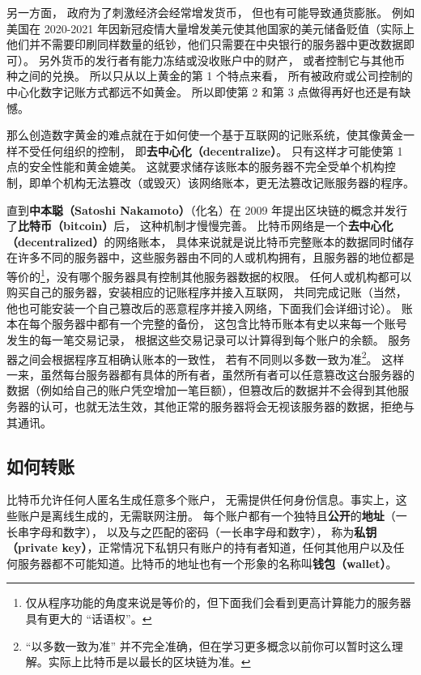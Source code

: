 另一方面， 政府为了刺激经济会经常增发货币， 但也有可能导致通货膨胀。 例如美国在 2020-2021 年因新冠疫情大量增发美元使其他国家的美元储备贬值（实际上他们并不需要印刷同样数量的纸钞，他们只需要在中央银行的服务器中更改数据即可）。 另外货币的发行者有能力冻结或没收账户中的财产， 或者控制它与其他币种之间的兑换。 所以只从以上黄金的第 1 个特点来看， 所有被政府或公司控制的中心化数字记账方式都远不如黄金。 所以即使第 2 和第 3 点做得再好也还是有缺憾。

那么创造数字黄金的难点就在于如何使一个基于互联网的记账系统，使其像黄金一样不受任何组织的控制， 即\textbf{去中心化（decentralize）}。 只有这样才可能使第 1 点的安全性能和黄金媲美。 这就要求储存该账本的服务器不完全受单个机构控制，即单个机构无法篡改（或毁灭）该网络账本，更无法篡改记账服务器的程序。

直到\textbf{中本聪（Satoshi Nakamoto）}（化名）在 2009 年提出区块链的概念并发行了\textbf{比特币（bitcoin）}后， 这种机制才慢慢完善。 比特币网络是一个\textbf{去中心化（decentralized）}的网络账本， 具体来说就是说比特币完整账本的数据同时储存在许多不同的服务器中，这些服务器由不同的人或机构拥有，且服务器的地位都是等价的\footnote{仅从程序功能的角度来说是等价的，但下面我们会看到更高计算能力的服务器具有更大的 “话语权”。}，没有哪个服务器具有控制其他服务器数据的权限。 任何人或机构都可以购买自己的服务器，安装相应的记账程序并接入互联网， 共同完成记账（当然，他也可能安装一个自己篡改后的恶意程序并接入网络，下面我们会详细讨论）。 账本在每个服务器中都有一个完整的备份， 这包含比特币账本有史以来每一个账号发生的每一笔交易记录， 根据这些交易记录可以计算得到每个账户的余额。 服务器之间会根据程序互相确认账本的一致性， 若有不同则以多数一致为准\footnote{“以多数一致为准” 并不完全准确，但在学习更多概念以前你可以暂时这么理解。实际上比特币是以最长的区块链为准。}。 这样一来，虽然每台服务器都有具体的所有者，虽然所有者可以任意篡改这台服务器的数据（例如给自己的账户凭空增加一笔巨额），但篡改后的数据并不会得到其他服务器的认可，也就无法生效，其他正常的服务器将会无视该服务器的数据，拒绝与其通讯。

\subsection{如何转账}
比特币允许任何人匿名生成任意多个账户， 无需提供任何身份信息。事实上，这些账户是离线生成的，无需联网注册。 每个账户都有一个独特且\textbf{公开}的\textbf{地址}（一长串字母和数字）， 以及与之匹配的密码（一长串字母和数字）， 称为\textbf{私钥（private key）}，正常情况下私钥只有账户的持有者知道，任何其他用户以及任何服务器都不可能知道。比特币的地址也有一个形象的名称叫\textbf{钱包（wallet）}。

